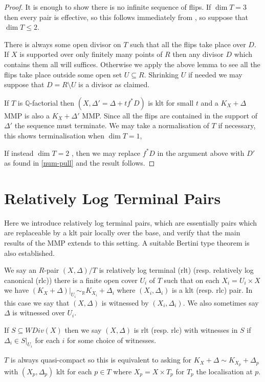 	\begin{proof}
		
		It is enough to show there is no infinite sequence of flips. If $\dim T=3$ then every pair is effective, so this follows immediately from \cite[Theorem F]{bhatt2020globally+}, so suppose that $\dim T \leq 2$.
		
		There is always some open divisor on $T$ such that all the flips take place over $D$. If $X$ is supported over only finitely many points of $R$ then any divisor $D$ which contains them all will suffices. Otherwise we apply the above lemma to see all the flips take place outside some open set $U \subseteq R$. Shrinking $U$ if needed we may suppose that $D=R \setminus U$ is a divisor as claimed.

		If $T$ is $\mathbb{Q}$-factorial then $(X,\Delta'=\Delta+tf^{*}D)$ is klt for small $t$ and a $K_{X}+\Delta$ MMP is also a $K_{X}+\Delta'$ MMP. Since all the flips are contained in the support of $\Delta'$ the sequence must terminate. We may take a normalisation of $T$ if necessary, this shows terminalisation when $\dim T=1$,
		
		If instead $\dim T =2$ , then we may replace $f^{*}D$ in the argument above with $D'$ as found in \autoref{num-pull} and the result follows.
		
	\end{proof}
	
	
	
	\section{Relatively Log Terminal Pairs} \label{rlt-section}


	Here we introduce relatively log terminal pairs, which are essentially pairs which are replaceable by a klt pair locally over the base, and verify that the main results of the MMP extends to this setting. A suitable Bertini type theorem is also established.
	
	\begin{definition}
		We say an $R$-pair $(X,\Delta)/T$ is relatively log terminal (rlt) (resp. relatively log canonical (rlc)) there is a finite open cover $U_{i}$ of $T$ such that on each $X_{i}=U_{i} \times X$ we have $(K_{X}+\Delta)|_{U_{i}} \sim_{\mathbb{R}} K_{X_{i}}+\Delta_{i}$ where $(X_{i},\Delta_{i})$ is a klt (resp. rlc) pair. In this case we say that $(X,\Delta)$ is witnessed by $(X_{i},\Delta_{i})$. We also sometimes say $\Delta$ is witnessed over $U_{i}$. 
		
		If $S \subseteq WDiv(X)$ then we say $(X,\Delta)$ is rlt (resp. rlc) with witnesses in $S$ if $\Delta_{i} \in S|_{U_{i}}$ for each $i$ for some choice of witnesses.
	\end{definition}
	\begin{remark}
		$T$ is always quasi-compact so this is equivalent to asking for $K_{X}+\Delta \sim K_{X_{p}}+\Delta_{p}$ with $(X_{p},\Delta_{p})$ klt for each $p \in T$ where $X_{p}=X \times T_{p}$ for $T_{p}$ the localisation at $p$.
	\end{remark}
	
